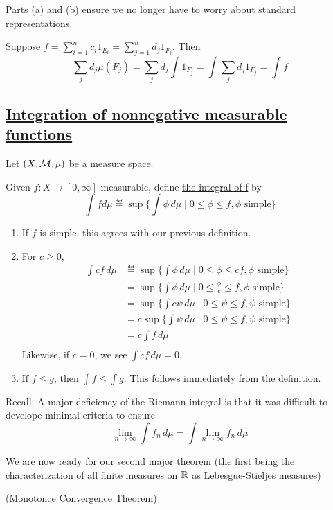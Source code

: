 \documentclass[x11names,reqno,14pt]{extarticle}
\newcommand*{\oo}{\infty}
\begin{document}
\rem Parts (a) and (b) ensure we no longer have to worry about standard representations.

Suppose $f = \sum_{i=1}^nc_i1_{E_i} = \sum_{j=1}^nd_j1_{F_j}$. Then
\[
\sum_jd_j\mu(F_j) = \sum_jd_j\int1_{F_j} = \int\sum_jd_j1_{F_j} = \int f
\]

\subsection*{\underline{Integration of nonnegative measurable functions}}

Let $(X, \mathcal{M}, \mu)$ be a measure space. 


Given $f:X\to[0,\oo]$ measurable, define \underline{the integral of f} by
\[
\int fd\mu \eqdef \sup\{\int\phi\,d\mu \mid 0 \leq \phi \leq f, \phi\text{ simple}\}
\]

\rem 
\begin{enumerate}[label=(\roman*)]
\item If $f$ is simple, this agrees with our previous definition.
\item For $c \geq 0$,
\begin{align*}
\int cf\,d\mu & \eqdef \sup\{\int\phi\,d\mu \mid 0 \leq \phi \leq cf, \phi\text{ simple}\} \\
				  & = \sup\{\int\phi\,d\mu \mid 0 \leq \frac{\phi}{c} \leq f, \phi\text{ simple} \}\\
				  & = \sup\{\int c\psi\,d\mu \mid 0 \leq \psi \leq f, \psi\text{ simple} \} \\
				  & = c\sup\{\int\psi\,d\mu\mid0\leq\psi\leq f, \psi\text{ simple} \} \\
				  & = c\int f\,d\mu\\
\end{align*}
Likewise, if $c = 0$, we see $\int cf\,d\mu = 0$. 
\item If $f \leq g$, then $\int f \leq \int g$. This follows immediately from the definition. 
\end{enumerate}

Recall: A major deficiency of the Riemann integral is that it was difficult to develope minimal criteria to ensure
\[
\lim_{n\to\oo}\int f_n\,d\mu = \int\lim_{n\to\oo}f_n\,d\mu
\]

We are now ready for our second major theorem (the first being the characterization of all finite measures on $\mathbb{R}$ as Lebesgue-Stieljes measures)

\thm (Monotonce Convergence Theorem)
\end{document}
